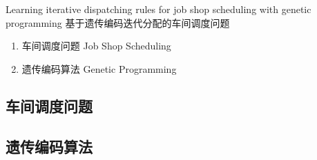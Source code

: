 \begin{frame}
    \Large Learning iterative dispatching rules for job shop scheduling with genetic programming 基于遗传编码迭代分配的车间调度问题 \cite{nguyenLearningIterativeDispatching2013}


    \begin{enumerate}
        \item 车间调度问题 Job Shop Scheduling 
        \item 遗传编码算法 Genetic Programming
    \end{enumerate}
\end{frame}

\subsection{车间调度问题}

\subsection{遗传编码算法}


